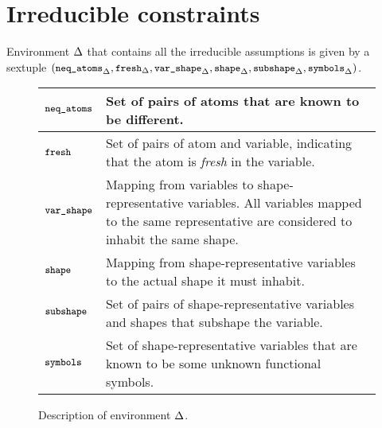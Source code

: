 \documentclass[english, mgr]{iithesis}
\renewcommand{\tt}[1]{\texttt{\small{#1}}}
\renewcommand{\it}[1]{\textit{#1}}
\newcommand{\NeqAtoms}{\tt{neq\_atoms}}
\newcommand{\Fresh}{\tt{fresh}}
\newcommand{\VarShape}{\tt{var\_shape}}
\newcommand{\Shape}{\tt{shape}}
\newcommand{\Subshape}{\tt{subshape}}
\newcommand{\Symbols}{\tt{symbols}}
\begin{document}
\section{Irreducible constraints} \label{sec:solverenv}
Environment $\Delta$ that contains all the irreducible assumptions is given by
a sextuple
$(\NeqAtoms_{\icEnv}
, \Fresh_{\icEnv}
, \VarShape_{\icEnv}
, \Shape_{\icEnv}
, \Subshape_{\icEnv}
, \Symbols_{\icEnv}
)$.
\begin{figure}[h]
  \begin{tabularx}{\textwidth}{|l|X|}
  \hline
    $\NeqAtoms$ & Set of pairs of atoms that are known to be different. \\
  \hline
    $\Fresh$ & Set of pairs of atom and variable, indicating that the atom is \it{fresh} in the variable. \\
  \hline
    $\VarShape$ & Mapping from variables to shape-representative variables. All variables mapped to the same representative are considered to inhabit the same shape. \\
  \hline
    $\Shape$ & Mapping from shape-representative variables to the actual shape it must inhabit. \\
  \hline
    $\Subshape$ & Set of pairs of shape-representative variables and shapes that subshape the variable. \\
  \hline
    $\Symbols$ & Set of shape-representative variables that are known to be some unknown functional symbols. \\
  \hline
  \end{tabularx}
  \caption{Description of environment $\Delta$.}
  \label{fig:assumption-equality-rules}
\end{figure}
\end{document}
